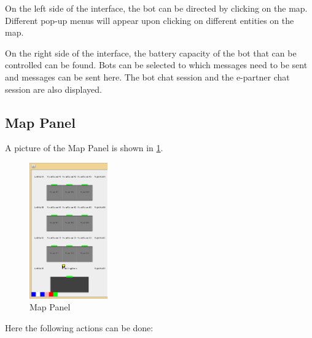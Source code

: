 On the left side of the interface, the bot can be directed by clicking on the map. Different pop-up menus will appear upon clicking on different entities on the map.

On the right side of the interface, the battery capacity of the bot that can be controlled can be found. Bots can be selected to which messages need to be sent and messages can be sent here. The bot chat session and the e-partner chat session are also displayed.


\subsection{Map Panel}
A picture of the Map Panel is shown in \ref{fig:mapPanel}.

\begin{figure}[h]
\begin{center}
\includegraphics[width= 0.3\textwidth]{HumanPlayerGUI/hpg-left.png}
\end{center}
\caption{Map Panel}
\label{fig:mapPanel}
\end{figure}

Here the following actions can be done:

